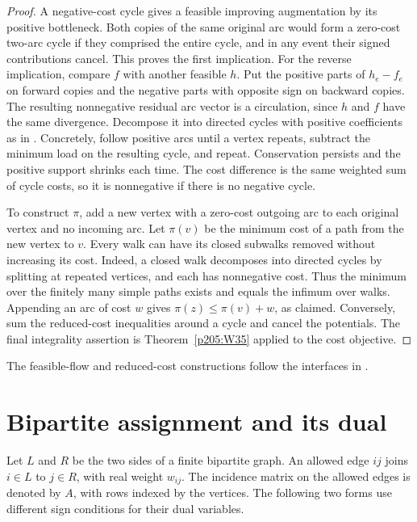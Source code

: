 \documentclass[11pt,oneside,openany]{book}
\theoremstyle{plain}
\theoremstyle{definition}
\theoremstyle{remark}
\begin{document}
\begin{proof}
A negative-cost cycle gives a feasible improving augmentation by
its positive bottleneck. Both copies of the same original arc
would form a zero-cost two-arc cycle if they comprised the entire
cycle, and in any event their signed contributions cancel.
This proves the first implication. For the reverse implication,
compare \(f\) with another feasible \(h\). Put the positive parts
of \(h_e-f_e\) on forward copies and the negative parts with
opposite sign on backward copies. The resulting nonnegative
residual arc vector is a circulation, since \(h\) and \(f\)
have the same divergence. Decompose it into directed cycles
with positive coefficients as in \cite[Chapter 7, W47]{p204}.
Concretely, follow positive arcs until a vertex repeats, subtract
the minimum load on the resulting cycle, and repeat. Conservation
persists and the positive support shrinks each time. The cost
difference is the same weighted sum of cycle costs, so it is
nonnegative if there is no negative cycle.

To construct \(\pi\), add a new vertex with a zero-cost outgoing
arc to each original vertex and no incoming arc. Let \(\pi(v)\)
be the minimum cost of a path from the new vertex to \(v\).
Every walk can have its closed subwalks removed without increasing
its cost. Indeed, a closed walk decomposes into directed cycles
by splitting at repeated vertices, and each has nonnegative cost.
Thus the minimum over the finitely many simple paths exists
and equals the infimum over walks. Appending an arc of cost
\(w\) gives \(\pi(z)\le\pi(v)+w\), as claimed. Conversely,
sum the reduced-cost inequalities around a cycle and cancel
the potentials. The final integrality assertion is
Theorem~\ref{p205:W35} applied to the cost objective.
\end{proof}

The feasible-flow and reduced-cost constructions follow the
interfaces in \cite[vol.~A, Sections 11.2--11.4 and 12.1--12.2]{schrijver}.

\section{Bipartite assignment and its dual}

Let \(L\) and \(R\) be the two sides of a finite bipartite graph.
An allowed edge \(ij\) joins \(i\in L\) to \(j\in R\), with
real weight \(w_{ij}\). The incidence matrix on the allowed edges
is denoted by \(A\), with rows indexed by the vertices. The
following two forms use different sign conditions for their
dual variables.
\end{document}
